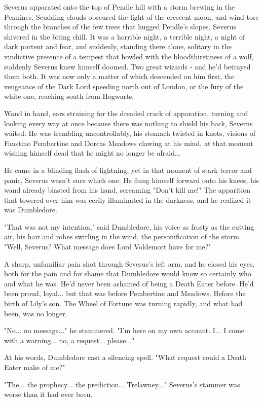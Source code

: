 \documentclass[a4paper,11pt]{article}
\begin{document}
Severus apparated onto the top of Pendle hill with a storm brewing in the Pennines. Scudding clouds obscured the light of the crescent moon, and wind tore through the branches of the few trees that hugged Pendle's slopes. Severus shivered in the biting chill. It was a horrible night, a terrible night, a night of dark portent and fear, and suddenly, standing there alone, solitary in the vindictive presence of a tempest that howled with the bloodthirstiness of a wolf, suddenly Severus knew himself doomed. Two great wizards - and he'd betrayed them both. It was now only a matter of which descended on him first, the vengeance of the Dark Lord speeding north out of London, or the fury of the white one, reaching south from Hogwarts.

Wand in hand, ears straining for the dreaded crack of apparation, turning and looking every way at once because there was nothing to shield his back, Severus waited. He was trembling uncontrollably, his stomach twisted in knots, visions of Faustino Pembertine and Dorcas Meadows clawing at his mind, at that moment wishing himself dead that he might no longer be afraid...

He came in a blinding flash of lightning, yet in that moment of stark terror and panic, Severus wasn't sure which one. He flung himself forward onto his knees, his wand already blasted from his hand, screaming "Don't kill me!" The apparition that towered over him was eerily illuminated in the darkness, and he realized it was Dumbledore.

"That was not my intention," said Dumbledore, his voice as frosty as the cutting air, his hair and robes swirling in the wind, the personification of the storm. "Well, Severus? What message does Lord Voldemort have for me?"

A sharp, unfamiliar pain shot through Severus's left arm, and he closed his eyes, both for the pain and for shame that Dumbledore would know so certainly who and what he was. He'd never been ashamed of being a Death Eater before. He'd been proud, loyal... but that was before Pembertine and Meadows. Before the birth of Lily's son. The Wheel of Fortune was turning rapidly, and what had been, was no longer.

"No... no message..." he stammered. "I'm here on my own account. I... I come with a warning... no, a request... please..."

At his words, Dumbledore cast a silencing spell. "What request could a Death Eater make of me?"

"The... the prophecy... the prediction... Trelawney..." Severus's stammer was worse than it had ever been.
\end{document}
